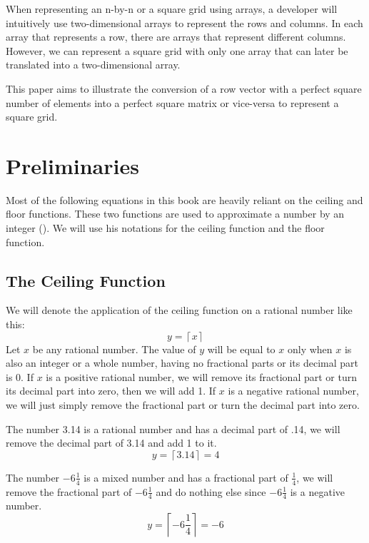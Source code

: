\documentclass[twoside,openany,12pt]{book}
\begin{document}
    When representing an n-by-n or a square grid using arrays, a developer will intuitively use two-dimensional arrays to represent the rows and columns. In each array that represents a row, there are arrays that represent different columns. However, we can represent a square grid with only one array that can later be translated into a two-dimensional array.

    This paper aims to illustrate the conversion of a row vector with a perfect square number of elements into a perfect square matrix or vice-versa to represent a square grid.

    \newpage
    \setcounter{chapter}{-1}

    \chapter{Preliminaries}
    Most of the following equations in this book are heavily reliant on the ceiling and floor functions. These two functions are used to approximate a number by an integer (\cite{iverson_notation}). We will use his notations for the ceiling function and the floor function.

    \section{The Ceiling Function}

    We will denote the application of the ceiling function on a rational number like this:
    \begin{equation}
        y = \left\lceil x \right\rceil
    \end{equation}
    Let $x$ be any rational number. The value of $y$ will be equal to $x$ only when $x$ is also an integer or a whole number, having no fractional parts or its decimal part is 0. If $x$ is a positive rational number, we will remove its fractional part or turn its decimal part into zero, then we will add 1. If $x$ is a negative rational number, we will just simply remove the fractional part or turn the decimal part into zero.

    The number 3.14 is a rational number and has a decimal part of .14, we will remove the decimal part of 3.14 and add 1 to it.
    \begin{equation*}
        y = \left\lceil 3.14 \right\rceil = 4
    \end{equation*}

    The number $-6\frac{1}{4}$ is a mixed number and has a fractional part of $\frac{1}{4}$, we will remove the fractional part of $-6\frac{1}{4}$ and do nothing else since $-6\frac{1}{4}$ is a negative number.
    \begin{equation*}
        y = \left\lceil -6\frac{1}{4} \right\rceil = -6
    \end{equation*}
\end{document}

